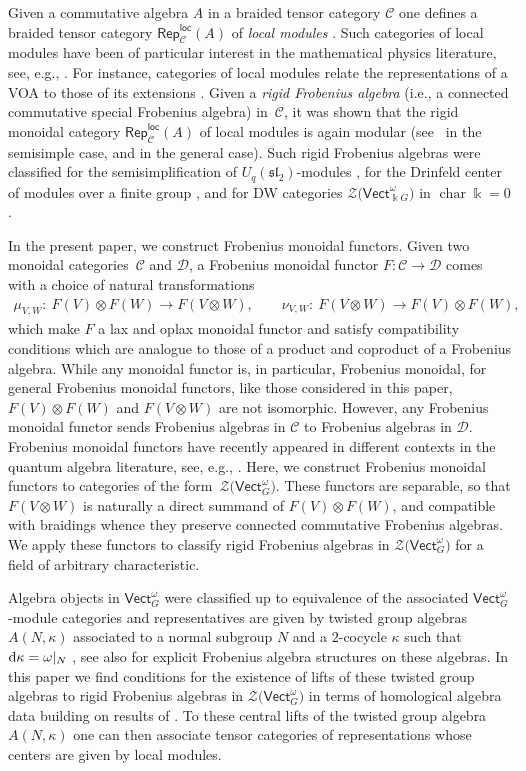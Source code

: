 \documentclass[pdftex]{sigma}
\numberwithin{equation}{section}
\newcommand{\cha}{\operatorname{char}}
\newcommand{\deri}{{\rm d}}
\newcommand{\locmod}{\mathsf{Rep}^{\mathsf{loc}}}
\newcommand{\Vect}{\mathsf{Vect}}
\newcommand{\cC}{\mathcal{C}}
\newcommand{\cD}{\mathcal{D}}
\newcommand{\cZ}{\mathcal{Z}}
\begin{document}
Given a commutative algebra $A$ in a braided tensor category $\cC$ one defines a braided tensor category $\locmod_\cC(A)$ of \emph{local modules} \cite{KO,LW3,Par,Sch}. Such categories of local modules have been of particular interest in the mathematical physics literature, see, e.g., \cite{FFRS, FRS}.
For instance, categories of local modules relate the representations of a VOA to those of its extensions \cite{CKM,HKL, KO}. Given a \emph{rigid Frobenius algebra} (i.e., a connected commutative special Frobenius algebra) in~$\cC$, it was shown that the rigid monoidal category $\locmod_\cC(A)$ of local modules is again modular (see~\cite{KO} in the semisimple case, and \cite{LW3} in the general case). Such rigid Frobenius algebras were classified for the semisimplification of $U_q(\mathfrak{sl}_2)$-modules \cite{KO}, for the Drinfeld center of modules over a finite group \cite{Dav3,LW3}, and for DW categories $\cZ\big(\Vect_{\Bbbk G}^\omega\big)$ in $\cha\Bbbk=0$ \cite{DS}.


In the present paper, we construct Frobenius monoidal functors. Given two monoidal cate\-gories~$\cC$ and $\cD$, a Frobenius monoidal functor $F\colon \cC\to \cD$ comes with a choice of natural transformations
\begin{gather*}
\mu_{V,W}\colon\ F(V)\otimes F(W)\to F(V\otimes W),\qquad
\nu_{V,W}\colon\ F(V\otimes W)\to F(V)\otimes F(W),
\end{gather*}
which make $F$ a lax and oplax monoidal functor and satisfy compatibility conditions which are analogue to those of a product and coproduct of a Frobenius algebra. While any monoidal functor is, in particular, Frobenius monoidal, for general Frobenius monoidal functors, like those considered in this paper, $F(V)\otimes F(W)$ and $F(V\otimes W)$ are not isomorphic. However, any Frobenius monoidal functor sends Frobenius algebras in $\cC$ to Frobenius algebras in $\cD$.
Frobenius monoidal functors have recently appeared in different contexts in the quantum algebra literature, see, e.g., \cite{FHL,WINART,Yad}. Here, we construct Frobenius monoidal functors to categories of the form~$\cZ\big(\Vect_G^\omega\big)$. These functors are separable, so that $F(V\otimes W)$ is naturally a direct summand of $F(V)\otimes F(W)$, and compatible with braidings whence they preserve connected commutative Frobenius algebras. We apply these functors to classify rigid Frobenius algebras in $\cZ\big(\Vect_G^\omega\big)$ for a field of arbitrary characteristic.

Algebra objects in $\Vect_G^\omega$ were classified up to equivalence of the associated $\Vect_G^\omega$-module categories and representatives are given by twisted group algebras $A(N,\kappa)$ associated to a normal subgroup $N$ and a $2$-cocycle $\kappa$ such that $\deri \kappa= \omega |_N$ \cite{Nat, Ost}, see also \cite{WINART} for explicit Frobenius algebra structures on these algebras. In this paper we find conditions for the existence of lifts of these twisted group algebras to rigid Frobenius algebras in $\cZ\big(\Vect_G^\omega\big)$ in terms of homological algebra data building on results of \cite{DS}. To these central lifts of the twisted group algebra $A(N,\kappa)$ one can then associate tensor categories of representations whose centers are given by local modules.
\end{document}
